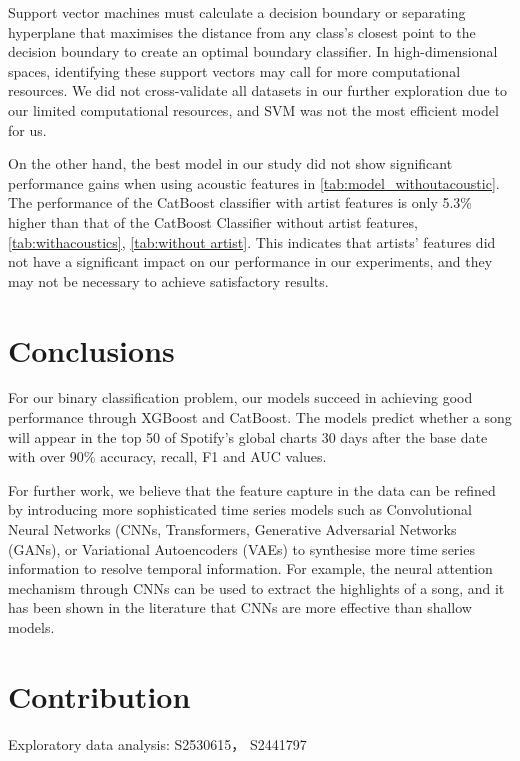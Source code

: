\documentclass{article}
\begin{document}
Support vector machines must calculate a decision boundary or separating hyperplane that maximises the distance from any class's closest point to the decision boundary to create an optimal boundary classifier. In high-dimensional spaces, identifying these support vectors may call for more computational resources. We did not cross-validate all datasets in our further exploration due to our limited computational resources, and SVM was not the most efficient model for us.

On the other hand, the best model in our study did not show significant performance gains when using acoustic features in  \autoref{tab:model_withoutacoustic}. The performance of the CatBoost classifier with artist features is only 5.3\% higher than that of the CatBoost Classifier without artist features, \autoref{tab:withacoustics}, \autoref{tab:without artist}. This indicates that artists' features did not have a significant impact on our performance in our experiments, and they may not be necessary to achieve satisfactory results.



\section{Conclusions}
For our binary classification problem, our models succeed in achieving good performance through XGBoost and CatBoost. The models predict whether a song will appear in the top 50 of Spotify's global charts 30 days after the base date with over 90\% accuracy, recall, F1 and AUC values.

For further work, we believe that the feature capture in the data can be refined by introducing more sophisticated time series models such as Convolutional Neural Networks (CNNs, Transformers, Generative Adversarial Networks (GANs), or Variational Autoencoders (VAEs) to synthesise more time series information to resolve temporal information. For example, the neural attention mechanism through CNNs can be used to extract the highlights of a song, and it has been shown in the literature that CNNs are more effective than shallow models\cite{CNN}.


\newpage




\newpage
\section*{Contribution}
    Exploratory data analysis: S2530615， S2441797 
\end{document}
